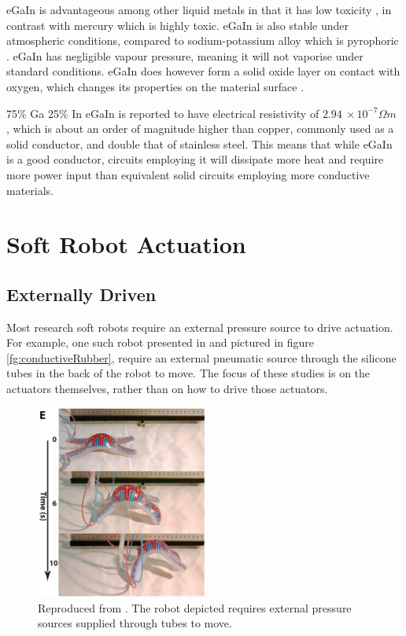 \documentclass[a4paper,12pt]{article}
\begin{document}
eGaIn is advantageous among other liquid metals in that it has low toxicity \cite{dickeyEutecticGalliumIndiumEGaIn2008}, in contrast with mercury which is highly toxic. eGaIn is also stable under atmospheric conditions, compared to sodium-potassium alloy which is pyrophoric \cite{houghtonHazards2007}. eGaIn has negligible vapour pressure, meaning it will not vaporise under standard conditions. eGaIn does however form a solid oxide layer on contact with oxygen, which changes its properties on the material surface \cite{liuCharacterizationNontoxicLiquidMetal2012}.

75\% Ga 25\% In eGaIn  is reported to have electrical resistivity of $2.94\ \times10^{-7} \Omega m$ \cite{zrnicResistivitySurfaceTension1969}, which is about an order of magnitude higher than copper, commonly used as a solid conductor, and double that of stainless steel. This means that while eGaIn is a good conductor, circuits employing it will dissipate more heat and require more power input than equivalent solid circuits employing more conductive materials.

\section{Soft Robot Actuation}
\subsection{Externally Driven}
Most research soft robots require an external pressure source to drive actuation. For example, one such robot presented in \cite{morinCamouflageDisplaySoft2012} and pictured in figure \ref{fg:conductiveRubber}, require an external pneumatic source through the silicone tubes in the back of the robot to move. The focus of these studies is on the actuators themselves, rather than on how to drive those actuators.

\begin{figure}[h!]
    \centering
    \includegraphics[width=0.5\textwidth]{externalpressure.png}
    \caption{Reproduced from \cite{morinCamouflageDisplaySoft2012}. The robot depicted requires external pressure sources supplied through tubes to move.}
    \label{fg:externalpressure}
\end{figure}
\end{document}
